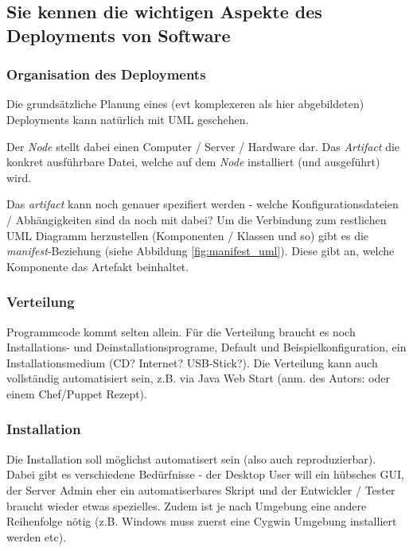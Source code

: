 \subsection{Sie kennen die wichtigen Aspekte des Deployments von Software}
\subsubsection{Organisation des Deployments}
Die grundsätzliche Planung eines (evt komplexeren als hier abgebildeten) Deployments kann natürlich mit UML geschehen.

Der \emph{Node} stellt dabei einen Computer / Server / Hardware dar. Das \emph{Artifact} die konkret ausführbare Datei, welche auf dem \emph{Node} installiert (und ausgeführt) wird.


Das \emph{artifact} kann noch genauer spezifiert werden - welche Konfigurationsdateien / Abhängigkeiten sind da noch mit dabei? Um die Verbindung zum restlichen UML Diagramm herzustellen (Komponenten / Klassen und so) gibt es die \emph{manifest}-Beziehung (siehe Abbildung \ref{fig:manifest_uml}). Diese gibt an, welche Komponente das Artefakt beinhaltet.

\subsubsection{Verteilung}
Programmcode kommt selten allein. Für die Verteilung braucht es noch Installations- und Deinstallationsprograme, Default und Beispielkonfiguration, ein Installationsmedium (CD? Internet? USB-Stick?).
Die Verteilung kann auch vollständig automatisiert sein, z.B. via Java Web Start (anm. des Autors: oder einem Chef/Puppet Rezept).
\subsubsection{Installation}
Die Installation soll möglichst automatisert sein (also auch reproduzierbar). Dabei gibt es verschiedene Bedürfnisse - der Desktop User will ein hübsches GUI, der Server Admin eher ein automatiserbares Skript und der Entwickler / Tester braucht wieder etwas spezielles. Zudem ist je nach Umgebung eine andere Reihenfolge nötig (z.B. Windows muss zuerst eine Cygwin Umgebung installiert werden etc). 

